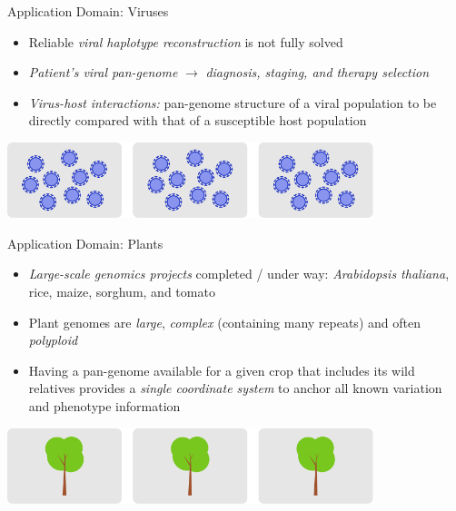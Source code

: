 \documentclass[notes=hide]{beamer}
\newcommand{\0}{\ensuremath{\mathtt{0}}}
\newcommand{\1}{\ensuremath{\mathtt{1}}}
\begin{document}
\begin{frame}{Application Domain: Viruses}
\begin{itemize}
 \item Reliable \emph{viral haplotype reconstruction} is not fully solved
 \item \emph{Patient's viral pan-genome} $\rightarrow$ \emph{diagnosis, staging, and therapy selection}
 \item \emph{Virus-host interactions:} pan-genome structure of a viral population to be directly compared with that of a susceptible host population
\end{itemize}
\begin{center}
\includegraphics[width=0.8\textwidth]{figs/data-sources-virus}
\end{center}
\end{frame}

\begin{frame}{Application Domain: Plants}
\begin{itemize}
 \item \emph{Large-scale genomics projects} completed / under way: \textit{Arabidopsis thaliana}, rice, maize, sorghum, and tomato
 \item Plant genomes are \emph{large}, \emph{complex} (containing many repeats) and often \emph{polyploid}
 \item Having a pan-genome available for a given crop that includes its wild relatives provides a \emph{single coordinate system} to anchor all known variation and phenotype information
\end{itemize}
\begin{center}
\includegraphics[width=0.8\textwidth]{figs/data-sources-plants}
\end{center}
\end{frame}
\end{document}
